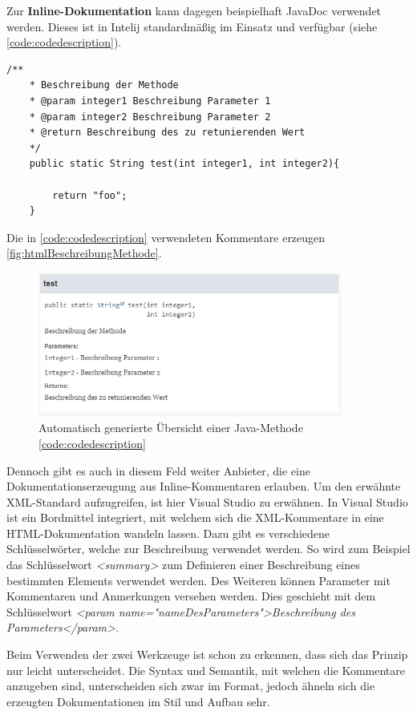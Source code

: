 Zur \textbf{Inline-Dokumentation} kann dagegen beispielhaft JavaDoc verwendet werden. Dieses ist in Intelij standardmäßig im Einsatz und verfügbar (siehe \autoref{code:codedescription}). 
\begin{lstlisting}[caption={Beispiel von Inline-Kommentaren}, label=code:codedescription]
	/**
	* Beschreibung der Methode
	* @param integer1 Beschreibung Parameter 1
	* @param integer2 Beschreibung Parameter 2
	* @return Beschreibung des zu retunierenden Wert
	*/
	public static String test(int integer1, int integer2){
		
		return "foo";
	}
\end{lstlisting}
\FloatBarrier
Die in \autoref{code:codedescription} verwendeten Kommentare erzeugen \autoref{fig:htmlBeschreibungMethode}. 
\begin{figure}
	\centering
	\includegraphics[width=10cm]{images/htmlBeschreibungMethode.png}
	\caption{Automatisch generierte Übersicht einer Java-Methode \autoref{code:codedescription}}
	\label{fig:htmlBeschreibungMethode}
\end{figure}
\FloatBarrier
Dennoch gibt es auch in diesem Feld weiter Anbieter, die eine Dokumentationserzeugung aus Inline-Kommentaren erlauben. Um den erwähnte XML-Standard aufzugreifen, ist hier Visual Studio zu erwähnen. In Visual Studio ist ein Bordmittel integriert, mit welchem sich die XML-Kommentare in eine HTML-Dokumentation wandeln lassen. Dazu gibt es verschiedene Schlüsselwörter, welche zur Beschreibung verwendet werden. So wird zum Beispiel das Schlüsselwort \textit{<summary>} zum Definieren einer Beschreibung eines bestimmten Elements verwendet werden. Des Weiteren können Parameter mit Kommentaren und Anmerkungen versehen werden. Dies geschieht mit dem Schlüsselwort \textit{<param name="nameDesParameters">Beschreibung des Parameters</param>}. 

Beim Verwenden der zwei Werkzeuge ist schon zu erkennen, dass sich das Prinzip nur leicht unterscheidet. Die Syntax und Semantik, mit welchen die Kommentare anzugeben sind, unterscheiden sich zwar im Format, jedoch ähneln sich die erzeugten Dokumentationen im Stil und Aufbau sehr. 

